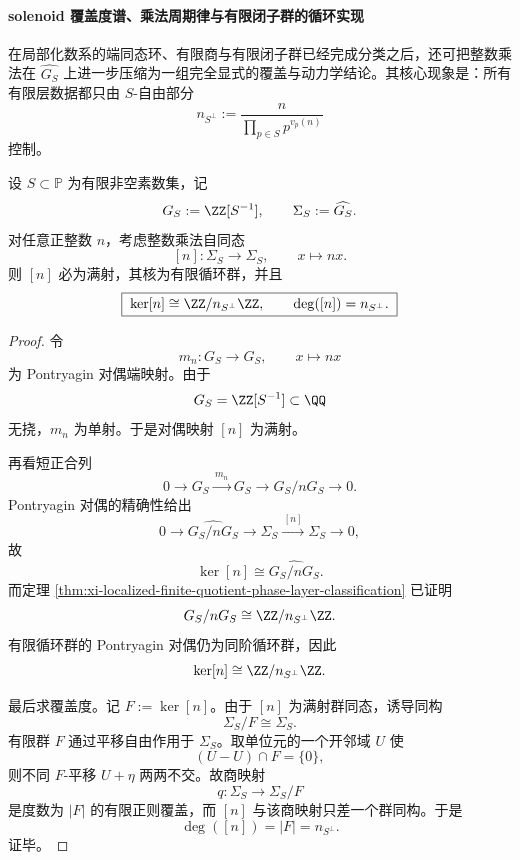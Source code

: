 \paragraph{solenoid 覆盖度谱、乘法周期律与有限闭子群的循环实现}
在局部化数系的端同态环、有限商与有限闭子群已经完成分类之后，还可把整数乘法在 \(\widehat{G_S}\) 上进一步压缩为一组完全显式的覆盖与动力学结论。其核心现象是：所有有限层数据都只由 \(S\)-自由部分
\[
n_{S^\perp}:=\frac{n}{\prod_{p\in S}p^{v_p(n)}}
\]
控制。

\begin{theorem}\label{thm:xi-localized-solenoid-multiplication-kernel-degree}
设 \(S\subset\mathbb P\) 为有限非空素数集，记
\[
G_S:=\ZZ[S^{-1}],
\qquad
\Sigma_S:=\widehat{G_S}.
\]
对任意正整数 \(n\)，考虑整数乘法自同态
\[
[n]:\Sigma_S\longrightarrow \Sigma_S,
\qquad
x\longmapsto nx.
\]
则 \([n]\) 必为满射，其核为有限循环群，并且
\[
\boxed{\;
\ker[n]\cong \ZZ/n_{S^\perp}\ZZ,
\qquad
\deg([n])=n_{S^\perp}.\;}
\]
\end{theorem}
\begin{proof}
令
\[
m_n:G_S\to G_S,
\qquad
x\mapsto nx
\]
为 Pontryagin 对偶端映射。由于
\[
G_S=\ZZ[S^{-1}]\subset \QQ
\]
无挠，\(m_n\) 为单射。于是对偶映射 \([n]\) 为满射。

再看短正合列
\[
0\longrightarrow G_S\xrightarrow{\,m_n\,}G_S\longrightarrow G_S/nG_S\longrightarrow 0.
\]
Pontryagin 对偶的精确性给出
\[
0\longrightarrow \widehat{G_S/nG_S}\longrightarrow \Sigma_S\xrightarrow{\,[n]\,}\Sigma_S\longrightarrow 0,
\]
故
\[
\ker[n]\cong \widehat{G_S/nG_S}.
\]
而定理 \ref{thm:xi-localized-finite-quotient-phase-layer-classification} 已证明
\[
G_S/nG_S\cong \ZZ/n_{S^\perp}\ZZ.
\]
有限循环群的 Pontryagin 对偶仍为同阶循环群，因此
\[
\ker[n]\cong \ZZ/n_{S^\perp}\ZZ.
\]

最后求覆盖度。记 \(F:=\ker[n]\)。由于 \([n]\) 为满射群同态，诱导同构
\[
\Sigma_S/F\cong \Sigma_S.
\]
有限群 \(F\) 通过平移自由作用于 \(\Sigma_S\)。取单位元的一个开邻域 \(U\) 使
\[
(U-U)\cap F=\{0\},
\]
则不同 \(F\)-平移 \(U+\eta\) 两两不交。故商映射
\[
q:\Sigma_S\to \Sigma_S/F
\]
是度数为 \(|F|\) 的有限正则覆盖，而 \([n]\) 与该商映射只差一个群同构。于是
\[
\deg([n])=|F|=n_{S^\perp}.
\]
证毕。
\end{proof}

